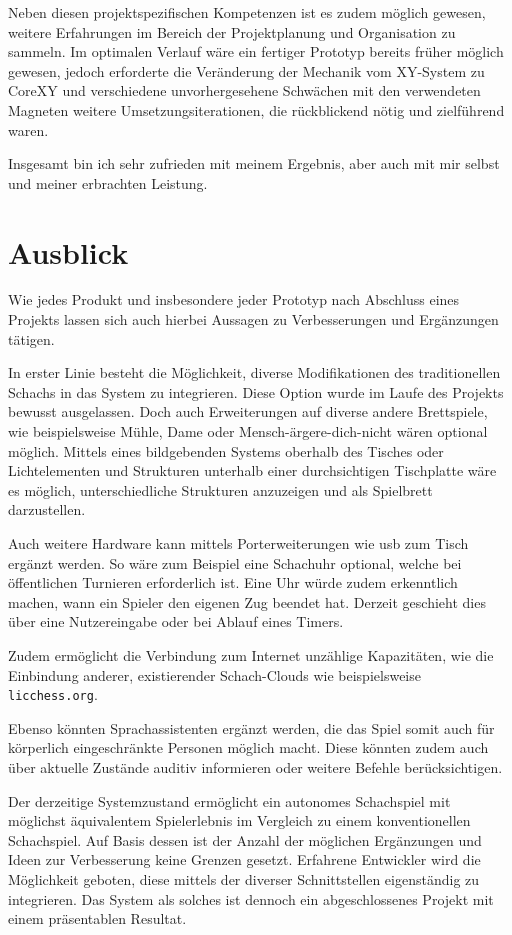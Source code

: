 Neben diesen projektspezifischen Kompetenzen ist es zudem möglich
gewesen, weitere Erfahrungen im Bereich der Projektplanung und
Organisation zu sammeln. Im optimalen Verlauf wäre ein fertiger Prototyp
bereits früher möglich gewesen, jedoch erforderte die Veränderung der
Mechanik vom XY-System zu CoreXY und verschiedene unvorhergesehene
Schwächen mit den verwendeten Magneten weitere Umsetzungsiterationen,
die rückblickend nötig und zielführend waren.

Insgesamt bin ich sehr zufrieden mit meinem Ergebnis, aber auch mit mir
selbst und meiner erbrachten Leistung.

\hypertarget{ausblick}{%
\section{Ausblick}\label{ausblick}}

Wie jedes Produkt und insbesondere jeder Prototyp nach Abschluss eines
Projekts lassen sich auch hierbei Aussagen zu Verbesserungen und
Ergänzungen tätigen.

In erster Linie besteht die Möglichkeit, diverse Modifikationen des
traditionellen Schachs in das System zu integrieren. Diese Option wurde
im Laufe des Projekts bewusst ausgelassen. Doch auch Erweiterungen auf
diverse andere Brettspiele, wie beispielsweise Mühle, Dame oder
Mensch-ärgere-dich-nicht wären optional möglich. Mittels eines
bildgebenden Systems oberhalb des Tisches oder Lichtelementen und
Strukturen unterhalb einer durchsichtigen Tischplatte wäre es möglich,
unterschiedliche Strukturen anzuzeigen und als Spielbrett darzustellen.

Auch weitere Hardware kann mittels Porterweiterungen wie \gls{usb} zum
Tisch ergänzt werden. So wäre zum Beispiel eine Schachuhr optional,
welche bei öffentlichen Turnieren erforderlich ist. Eine Uhr würde zudem
erkenntlich machen, wann ein Spieler den eigenen Zug beendet hat.
Derzeit geschieht dies über eine Nutzereingabe oder bei Ablauf eines
Timers.

Zudem ermöglicht die Verbindung zum Internet unzählige Kapazitäten, wie
die Einbindung anderer, existierender Schach-Clouds wie beispielsweise
\passthrough{\lstinline!licchess.org!}.

Ebenso könnten Sprachassistenten ergänzt werden, die das Spiel somit
auch für körperlich eingeschränkte Personen möglich macht. Diese könnten
zudem auch über aktuelle Zustände auditiv informieren oder weitere
Befehle berücksichtigen.

Der derzeitige Systemzustand ermöglicht ein autonomes Schachspiel mit
möglichst äquivalentem Spielerlebnis im Vergleich zu einem
konventionellen Schachspiel. Auf Basis dessen ist der Anzahl der
möglichen Ergänzungen und Ideen zur Verbesserung keine Grenzen gesetzt.
Erfahrene Entwickler wird die Möglichkeit geboten, diese mittels der
diverser Schnittstellen eigenständig zu integrieren. Das System als
solches ist dennoch ein abgeschlossenes Projekt mit einem präsentablen
Resultat.


